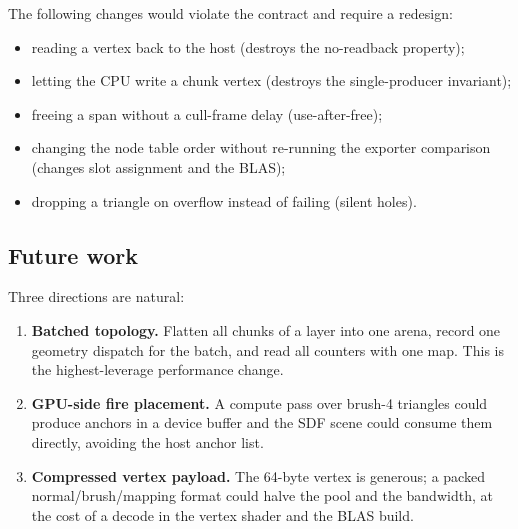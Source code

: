 The following changes would violate the contract and require a redesign:
\begin{itemize}
\item reading a vertex back to the host (destroys the no-readback
  property);
\item letting the CPU write a chunk vertex (destroys the single-producer
  invariant);
\item freeing a span without a cull-frame delay (use-after-free);
\item changing the node table order without re-running the exporter
  comparison (changes slot assignment and the BLAS);
\item dropping a triangle on overflow instead of failing (silent holes).
\end{itemize}

\subsection{Future work}

Three directions are natural:
\begin{enumerate}
\item \textbf{Batched topology.}  Flatten all chunks of a layer into one
  arena, record one geometry dispatch for the batch, and read all counters
  with one map.  This is the highest-leverage performance change.
\item \textbf{GPU-side fire placement.}  A compute pass over brush-4
  triangles could produce anchors in a device buffer and the SDF scene
  could consume them directly, avoiding the host anchor list.
\item \textbf{Compressed vertex payload.}  The 64-byte vertex is generous;
  a packed normal/brush/mapping format could halve the pool and the
  bandwidth, at the cost of a decode in the vertex shader and the BLAS
  build.
\end{enumerate}
